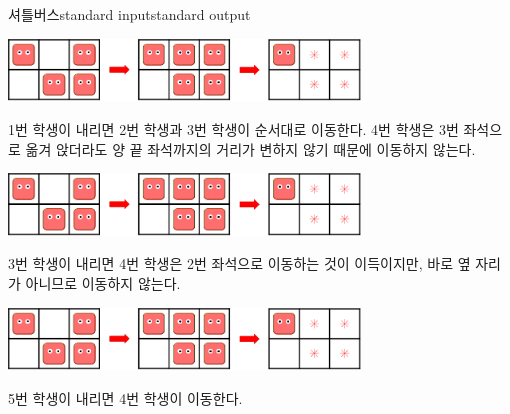 \begin{problem}{셔틀버스}{standard input}{standard output}
\Example

\begin{example}
%
\end{example}

\Notes

\begin{center}
  \includegraphics[width=0.7\textwidth]{nemo.png}
\end{center}

1번 학생이 내리면 2번 학생과 3번 학생이 순서대로 이동한다. 4번 학생은 3번 좌석으로 옮겨 앉더라도 양 끝 좌석까지의 거리가 변하지 않기 때문에 이동하지 않는다.

\begin{center}
  \includegraphics[width=0.7\textwidth]{nemo.png}
\end{center}

3번 학생이 내리면 4번 학생은 2번 좌석으로 이동하는 것이 이득이지만, 바로 옆 자리가 아니므로 이동하지 않는다.

\begin{center}
  \includegraphics[width=0.7\textwidth]{nemo.png}
\end{center}

5번 학생이 내리면 4번 학생이 이동한다.

\end{problem}

